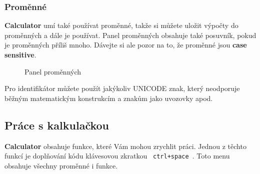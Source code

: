 \documentclass[a4paper, 11pt]{article}
\begin{document}
\subsubsection{Proměnné}

\textbf{Calculator} umí také používat proměnné, takže si můžete uložit výpočty do
proměnných a dále je používat. Panel proměnných obsahuje také posuvník,
pokud je proměnných příliš mnoho.
\vspace{0.5cm}
\noindent
Dávejte si ale pozor na to, že proměnné jsou \textbf{case sensitive}.

\begin{figure}[H]
    \centering
    \caption{Panel proměnných}
\end{figure}

Pro identifikátor můžete použít jakýkoliv UNICODE znak, který neodporuje
běžným matematickým konstrukcím a znakům jako uvozovky apod.

\subsection{Práce s kalkulačkou}

\textbf{Calculator} obsahuje funkce, které Vám mohou zrychlit práci.
Jednou z těchto funkcí je doplňování kódu klávesovou zkratkou
\texttt{ ctrl+space }. Toto menu obsahuje všechny proměnné i funkce.
\end{document}
